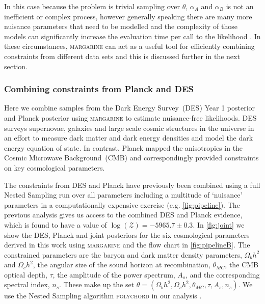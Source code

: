 In this case because the problem is trivial sampling over $\theta$, $\alpha_A$ and $\alpha_B$ is not an inefficient or complex process, however generally speaking there are many more nuisance parameters that need to be modelled and the complexity of those models can significantly increase the evaluation time per call to the likelihood \citep[e.g. \cref{ch:saras2}, ][]{Bevins_SARAS2_2022}. In these circumstances, \textsc{margarine} can act as a useful tool for efficiently combining constraints from different data sets \citep[e.g. \cref{ch:hera_saras3}, ][]{Bevins_hera_saras3_2023} and this is discussed further in the next section.

\subsubsection{Combining constraints from Planck and DES}
\label{sec:results}

Here we combine samples from the Dark Energy Survey~(DES) Year 1 posterior \cite{DES_Year1_2018} and Planck posterior \cite{Planck2018} using \textsc{margarine} to estimate nuisance-free likelihoods. DES surveys supernovae, galaxies and large scale cosmic structures in the universe in an effort to measure dark matter and dark energy densities and model the dark energy equation of state. In contrast, Planck mapped the anisotropies in the Cosmic Microwave Background~(CMB) and correspondingly provided constraints on key cosmological parameters.

The constraints from DES and Planck have previously been combined using a full Nested Sampling run over all parameters including a multitude of `nuisance' parameters in a computationally expensive exercise \cite{Handley_tensions_2019} (e.g. \cref{fig:pipeline}). %
The previous analysis gives us access to the combined DES and Planck evidence, which is found to have a value of $\log(\mathcal{Z}) = -5965.7 \pm 0.3$. In \cref{fig:joint} we show the DES, Planck and joint posteriors for the six cosmological parameters derived in this work using \textsc{margarine} and the flow chart in \cref{fig:pipelineB}. The constrained parameters are the baryon and dark matter density parameters, $\Omega_b h^2$ and $\Omega_c h^2$, the angular size of the sound horizon at recombination, $\theta_{MC}$, the CMB optical depth, $\tau$, the amplitude of the power spectrum, $A_s$, and the corresponding spectral index, $n_s$. These make up the set $\theta = (\Omega_b h^2, \Omega_c h^2, \theta_{MC}, \tau, A_s, n_s)$. We use the Nested Sampling algorithm \textsc{polychord} in our analysis \cite{Handley2015a, Handley2015b}.

